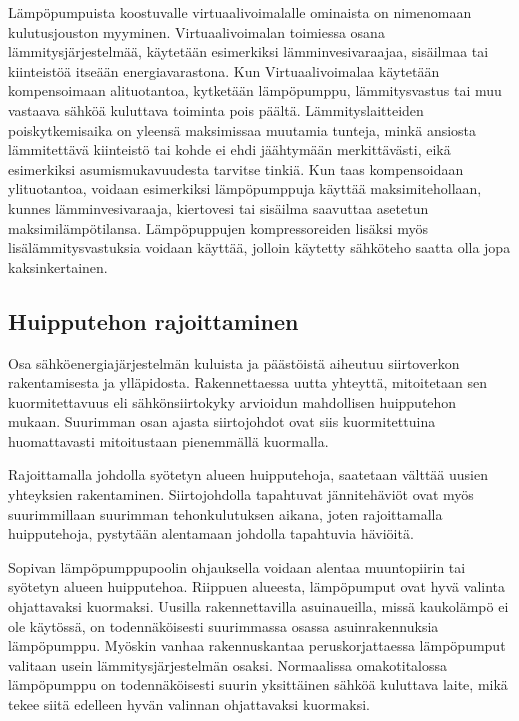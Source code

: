   Lämpöpumpuista koostuvalle virtuaalivoimalalle ominaista on nimenomaan kulutusjouston myyminen. Virtuaalivoimalan toimiessa osana lämmitysjärjestelmää, käytetään esimerkiksi lämminvesivaraajaa, sisäilmaa tai kiinteistöä itseään energiavarastona. Kun Virtuaalivoimalaa käytetään kompensoimaan alituotantoa, kytketään lämpöpumppu, lämmitysvastus tai muu vastaava sähköä kuluttava toiminta pois päältä. Lämmityslaitteiden poiskytkemisaika on yleensä maksimissaa muutamia tunteja, minkä ansiosta lämmitettävä kiinteistö tai kohde ei ehdi jäähtymään merkittävästi, eikä esimerkiksi asumismukavuudesta tarvitse tinkiä. Kun taas kompensoidaan ylituotantoa, voidaan esimerkiksi lämpöpumppuja käyttää maksimitehollaan, kunnes lämminvesivaraaja, kiertovesi tai sisäilma saavuttaa asetetun maksimilämpötilansa. Lämpöpuppujen kompressoreiden lisäksi myös lisälämmitysvastuksia voidaan käyttää, jolloin käytetty sähköteho saatta olla jopa kaksinkertainen.

\subsection{Huipputehon rajoittaminen}

  Osa sähköenergiajärjestelmän kuluista ja päästöistä aiheutuu siirtoverkon rakentamisesta ja ylläpidosta. Rakennettaessa uutta yhteyttä, mitoitetaan sen kuormitettavuus eli sähkönsiirtokyky arvioidun mahdollisen huipputehon mukaan. Suurimman osan ajasta siirtojohdot ovat siis kuormitettuina huomattavasti mitoitustaan pienemmällä kuormalla.

  Rajoittamalla johdolla syötetyn alueen huipputehoja, saatetaan välttää uusien yhteyksien rakentaminen. Siirtojohdolla tapahtuvat jännitehäviöt ovat myös suurimmillaan suurimman tehonkulutuksen aikana, joten rajoittamalla huipputehoja, pystytään alentamaan johdolla tapahtuvia häviöitä.

  Sopivan lämpöpumppupoolin ohjauksella voidaan alentaa muuntopiirin tai syötetyn alueen huipputehoa. Riippuen alueesta, lämpöpumput ovat hyvä valinta ohjattavaksi kuormaksi. Uusilla rakennettavilla asuinaueilla, missä kaukolämpö ei ole käytössä, on todennäköisesti suurimmassa osassa asuinrakennuksia lämpöpumppu. Myöskin vanhaa rakennuskantaa peruskorjattaessa lämpöpumput valitaan usein lämmitysjärjestelmän osaksi. Normaalissa omakotitalossa lämpöpumppu on todennäköisesti suurin yksittäinen sähköä kuluttava laite, mikä tekee siitä edelleen hyvän valinnan ohjattavaksi kuormaksi.

